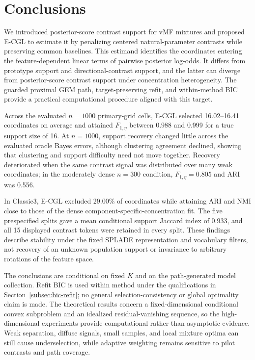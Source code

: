 \documentclass[preprint,12pt,authoryear]{elsarticle}
\begin{document}
\section{Conclusions}

We introduced posterior-score contrast support for vMF mixtures and proposed
E-CGL to estimate it by penalizing centered natural-parameter contrasts while
preserving common baselines. This estimand identifies the coordinates entering
the feature-dependent linear terms of pairwise posterior log-odds. It differs
from prototype support and directional-contrast support, and the latter can
diverge from posterior-score contrast support under concentration
heterogeneity. The
guarded proximal GEM path, target-preserving refit, and within-method BIC
provide a practical computational procedure aligned with this target.

Across the evaluated $n=1000$ primary-grid cells, E-CGL selected 16.02--16.41
coordinates on average and attained $F_{1,\eta}$ between 0.988 and 0.999 for a
true support size of 16. At $n=1000$, support recovery changed little across
the evaluated oracle Bayes errors, although clustering agreement declined,
showing that clustering and
support difficulty need not move together. Recovery deteriorated when the same
contrast signal was distributed over many weak coordinates; in the moderately
dense $n=300$ condition, $F_{1,\eta}=0.805$ and ARI was 0.556.

In Classic3, E-CGL excluded 29.00\% of coordinates while attaining ARI and NMI
close to those of the dense component-specific-concentration fit. The five
prespecified splits gave a mean
conditional support Jaccard index of 0.933, and all 15 displayed contrast
tokens were retained in every split. These findings describe stability under
the fixed SPLADE representation and vocabulary filters, not recovery of an
unknown population support or invariance to arbitrary rotations of the feature
space.

The conclusions are conditional on fixed $K$ and on the path-generated model
collection. Refit BIC is used within method under the qualifications in
Section~\ref{subsec:bic-refit}; no general selection-consistency or global
optimality claim is made. The theoretical results concern a fixed-dimensional
conditional convex subproblem and an idealized residual-vanishing sequence, so
the high-dimensional experiments provide computational rather than asymptotic
evidence. Weak separation, diffuse signals, small samples, and local mixture
optima can still cause underselection, while adaptive weighting remains
sensitive to pilot contrasts and path coverage.
\end{document}
